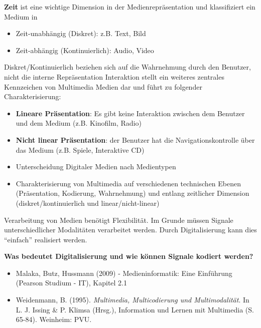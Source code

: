   \begin{bsslide}
    \textbf{Zeit} ist eine wichtige Dimension in der Medienrepr\"asentation und klassifiziert ein Medium in
    \begin{itemize}
      \item Zeit-unabh\"angig (Diskret): z.B. Text, Bild
      \item Zeit-abh\"angig (Kontinuierlich): Audio, Video
    \end{itemize}
    Diskret/Kontinuierlich beziehen sich auf die Wahrnehmung durch den Benutzer, nicht die interne Repr\"asentation
    Interaktion stellt ein weiteres zentrales Kennzeichen von Multimedia Medien dar und f\"uhrt zu folgender Charakterisierung:
    \begin{itemize}
      \item \textbf{Lineare Pr\"asentation}: Es gibt keine Interaktion zwischen dem Benutzer und dem Medium (z.B. Kinofilm, Radio)
      \item \textbf{Nicht linear Pr\"asentation}: der Benutzer hat die Navigationskontrolle \"uber das Medium (z.B. Spiele, Interaktive CD)
    \end{itemize}
  \end{bsslide}
  
  \begin{bsslide}
    
    \begin{itemize}
      \item  Unterscheidung Digitaler Medien nach Medientypen
      \item Charakterisierung von Multimedia auf verschiedenen technischen Ebenen (Pr\"asentation, Kodierung, Wahrnehmung) und entlang zeitlicher Dimension (diskret/kontinuierlich und linear/nicht-linear)
    \end{itemize}
    Verarbeitung von Medien ben\"otigt Flexibilit\"at. Im Grunde m\"ussen Signale unterschiedlicher Modalit\"aten verarbeitet werden. Durch Digitalisierung kann dies "`einfach"' realisiert werden. \\
    
    \centering \textbf{Was bedeutet Digitalisierung und wie k\"onnen
      Signale kodiert werden?}
    
  \end{bsslide}

\begin{bsslide}
    \begin{itemize}
      \item Malaka, Butz, Hussmann (2009) - Medieninformatik: Eine
        Einf\"uhrung (Pearson Studium - IT), Kapitel 2.1
      \item Weidenmann, B. (1995). \emph{Multimedia, Multicodierung
          und Multimodalit\"at}. In L. J. Issing \& P. Klimsa (Hrsg.),
        Information und Lernen mit Multimedia (S. 65-84). Weinheim:
        PVU.

      \end{itemize}
\end{bsslide}
